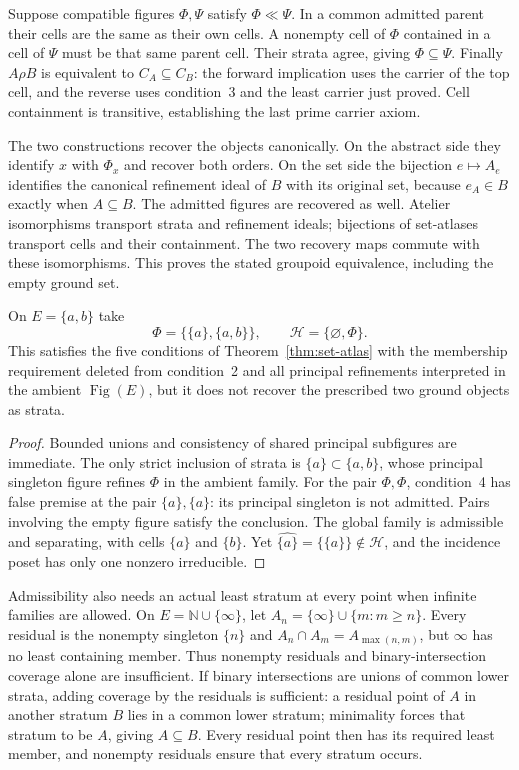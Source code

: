 Suppose compatible figures $\Phi,\Psi$ satisfy
$\Phi\ll\Psi$. In a common admitted parent their cells
are the same as their own cells. A nonempty cell of $\Phi$
contained in a cell of $\Psi$ must be that same parent cell.
Their strata agree, giving $\Phi\subseteq\Psi$.
Finally $A\rho B$ is equivalent to $C_A\subseteq C_B$:
the forward implication uses the carrier of the top cell,
and the reverse uses condition~3 and the least carrier just
proved. Cell containment is transitive, establishing the last
prime carrier axiom.

The two constructions recover the objects canonically.
On the abstract side they identify $x$ with $\Phi_x$ and
recover both orders. On the set side the bijection $e\mapsto A_e$
identifies the canonical refinement ideal of $B$ with its
original set, because $e_A\in B$ exactly when $A\subseteq B$.
The admitted figures are recovered as well. Atelier isomorphisms
transport strata and refinement ideals; bijections of set-atlases
transport cells and their containment. The two recovery maps
commute with these isomorphisms. This proves the stated groupoid
equivalence, including the empty ground set.

\begin{counterexample}
\label{ex:missing-principal}
On $E=\{a,b\}$ take
\[
 \Phi=\{\{a\},\{a,b\}\},\qquad
 \mathscr H=\{\varnothing,\Phi\}.
\]
This satisfies the five conditions of Theorem~\ref{thm:set-atlas}
with the membership requirement deleted from condition~2 and
all principal refinements interpreted in the ambient
$\operatorname{Fig}(E)$, but it does not recover the prescribed
two ground objects as strata.
\end{counterexample}
\begin{proof}
Bounded unions and consistency of shared principal subfigures
are immediate. The only strict inclusion of strata is
$\{a\}\subset\{a,b\}$, whose principal singleton figure
refines $\Phi$ in the ambient family. For the pair $\Phi,\Phi$,
condition~4 has false premise at the pair $\{a\},\{a\}$:
its principal singleton is not admitted. Pairs involving the
empty figure satisfy the conclusion. The global family is
admissible and separating, with cells $\{a\}$ and $\{b\}$.
Yet $\widehat{\{a\}}=\{\{a\}\}\notin\mathscr H$,
and the incidence poset has only one nonzero irreducible.
\end{proof}

Admissibility also needs an actual least stratum at every point
when infinite families are allowed. On
$E=\mathbb N\cup\{\infty\}$, let
$A_n=\{\infty\}\cup\{m:m\geq n\}$.
Every residual is the nonempty singleton $\{n\}$ and
$A_n\cap A_m=A_{\max(n,m)}$, but $\infty$ has no least
containing member. Thus nonempty residuals and binary-intersection
coverage alone are insufficient. If binary intersections are
unions of common lower strata, adding coverage by the residuals
is sufficient: a residual point of $A$ in another stratum $B$
lies in a common lower stratum; minimality forces that stratum
to be $A$, giving $A\subseteq B$. Every residual point then
has its required least member, and nonempty residuals ensure
that every stratum occurs.

